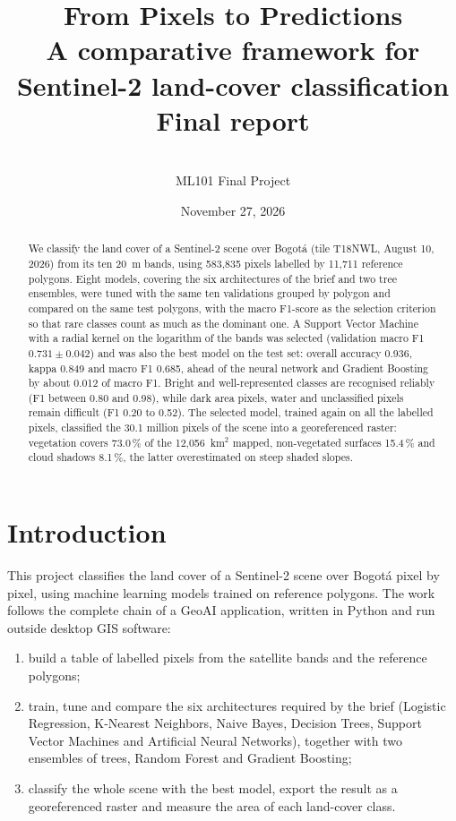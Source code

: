 \documentclass[11pt,a4paper]{article}
\title{From Pixels to Predictions\\[0.3em]
\large A comparative framework for Sentinel-2 land-cover classification\\
Final report}
\author{\reportauthors\\[0.3em] ML101 Final Project}
\date{November 27, 2026}
\begin{document}
\maketitle

\begin{abstract}
\noindent
We classify the land cover of a Sentinel-2 scene over Bogot\'a (tile T18NWL,
August 10, 2026) from its ten 20~m bands, using 583,835 pixels labelled by
11,711 reference polygons. Eight models, covering the six architectures of the
brief and two tree ensembles, were tuned with the same ten validations grouped
by polygon and compared on the same test polygons, with the macro F1-score as
the selection criterion so that rare classes count as much as the dominant
one. A Support Vector Machine with a radial kernel on the logarithm of the
bands was selected (validation macro F1 $0.731 \pm 0.042$) and was also the
best model on the test set: overall accuracy 0.936, kappa 0.849 and macro F1
0.685, ahead of the neural network and Gradient Boosting by about 0.012 of
macro F1. Bright and well-represented classes are recognised reliably (F1
between 0.80 and 0.98), while dark area pixels, water and unclassified pixels
remain difficult (F1 0.20 to 0.52). The selected model, trained again on all
the labelled pixels, classified the 30.1 million pixels of the scene into a
georeferenced raster: vegetation covers 73.0\,\% of the 12,056~km$^2$ mapped,
non-vegetated surfaces 15.4\,\% and cloud shadows 8.1\,\%, the latter
overestimated on steep shaded slopes.
\end{abstract}

\section{Introduction}

This project classifies the land cover of a Sentinel-2 scene over Bogot\'a
pixel by pixel, using machine learning models trained on reference polygons.
The work follows the complete chain of a GeoAI application, written in Python
and run outside desktop GIS software:

\begin{enumerate}
  \item build a table of labelled pixels from the satellite bands and the
  reference polygons;
  \item train, tune and compare the six architectures required by the brief
  (Logistic Regression, K-Nearest Neighbors, Naive Bayes, Decision Trees,
  Support Vector Machines and Artificial Neural Networks), together with two
  ensembles of trees, Random Forest and Gradient Boosting;
  \item classify the whole scene with the best model, export the result as a
  georeferenced raster and measure the area of each land-cover class.
\end{enumerate}
\end{document}
